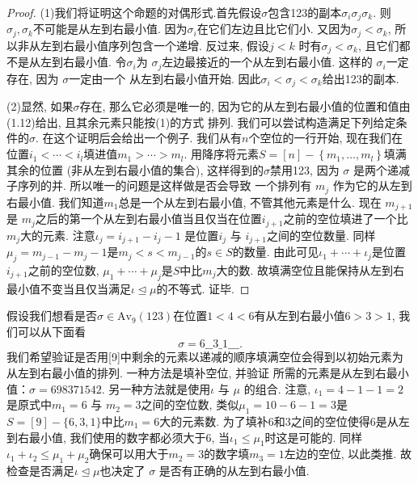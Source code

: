 \documentclass{ctexbook}
\begin{document}
      \begin{proof}
     	(1)我们将证明这个命题的对偶形式.首先假设$\sigma$包含123的副本$\sigma_{i} \sigma_{j} \sigma_{k}$.
     	则$\sigma_{j}, \sigma_{k}$不可能是从左到右最小值. 因为$\sigma_{i}$在它们左边且比它们小. 又因为$\sigma_{j}<\sigma_{k}$,
     	所以非从左到右最小值序列包含一个递增. 反过来, 假设$j<k$ 时有$\sigma_{j}<\sigma_{k}$, 且它们都不是从左到右最小值.
     	令$\sigma_{i}$为 $\sigma_{j}$左边最接近的一个从左到右最小值. 这样的 $\sigma_{i}$一定存在, 因为 $\sigma$一定由一个
     	从左到右最小值开始. 因此$\sigma_{i}<\sigma_{j}<\sigma_{k}$给出123的副本.

     	(2)显然, 如果$\sigma$存在, 那么它必须是唯一的, 因为它的从左到右最小值的位置和值由(1.12)给出, 且其余元素只能按(1)的方式
     	排列. 我们可以尝试构造满足下列给定条件的$\sigma$. 在这个证明后会给出一个例子. 我们从有$n$个空位的一行开始, 现在我们在
     	位置$i_{1}<\cdots<i_{l}$填进值$m_{1}>\cdots>m_{l}$. 用降序将元素$S=[n]-\left\{m_{1}, \ldots, m_{l}\right\}$填满其余的位置
     	(非从左到右最小值的集合), 这样得到的$\sigma$禁用123, 因为 $\sigma$ 是两个递减子序列的并. 所以唯一的问题是这样做是否会导致
     	一个排列有 $m_{j}$ 作为它的从左到右最小值. 我们知道$m_{1}$总是一个从左到右最小值, 不管其他元素是什么. 现在 $m_{j+1}$是
     	$m_{j}$之后的第一个从左到右最小值当且仅当在位置$i_{j+1}$之前的空位填进了一个比$m_{j}$大的元素. 注意$\iota_{j}=i_{j+1}-i_{j}-1$
     	是位置$i_{j}$ 与 $i_{j+1}$之间的空位数量. 同样$\mu_{j}=m_{j-1}-m_{j}-1$是$m_{j}<s<m_{j-1}$的$s \in S$的数量.
     	由此可见$\iota_{1}+\cdots+\iota_{j}$是位置$i_{j+1}$之前的空位数, $\mu_{1}+\cdots+\mu_{j}$是$S$中比$m_{j}$大的数.
     	故填满空位且能保持从左到右最小值不变当且仅当满足$\iota \unlhd \mu$的不等式. 证毕.
     \end{proof}

假设我们想看是否$\sigma \in \mathrm{Av}_{9}(123)$在位置$1<4<6$有从左到右最小值$6>3>1$, 我们可以从下面看
\begin{equation}
    \sigma=6\_ \_3\_ 1\_ \_ \_.
\end{equation}
我们希望验证是否用[9]中剩余的元素以递减的顺序填满空位会得到以初始元素为从左到右最小值的排列. 一种方法是填补空位, 并验证
所需的元素是从左到右最小值：$\sigma=698371542$. 另一种方法就是使用$\iota$ 与 $\mu$ 的组合. 注意, $\iota_{1}=4-1-1=2$
是原式中$m_{1}=6$ 与 $m_{2}=3$之间的空位数, 类似$\mu_{1}=10-6-1=3$是$S=[9]-\{6,3,1\}$中比$m_{1}=6$大的元素数.
为了填补6和3之间的空位使得6是从左到右最小值, 我们使用的数字都必须大于6, 当$\iota_{1} \leqslant \mu_{1} $时这是可能的.
同样$\iota_{1}+\iota_{2} \leqslant \mu_{1}+\mu_{2}$确保可以用大于$m_{2}=3$的数字填$m_{3}=1$左边的空位, 以此类推.
故检查是否满足$\iota \unlhd \mu$也决定了 $\sigma$ 是否有正确的从左到右最小值.
\end{document}
